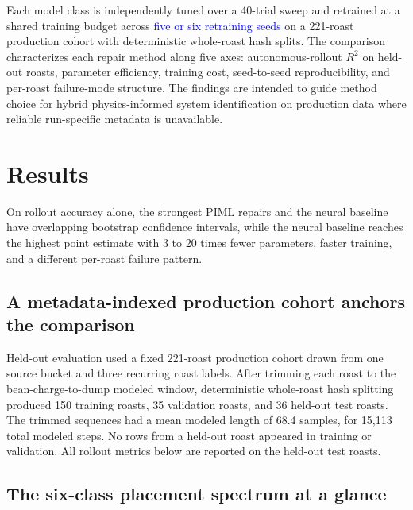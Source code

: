 \documentclass[fleqn,10pt]{wlscirep}
\newcommand{\rev}[1]{\textcolor{blue}{#1}}
\begin{document}
Each model class is independently tuned over a 40-trial sweep and retrained at a shared training budget across \rev{five or six retraining seeds} on a 221-roast production cohort with deterministic whole-roast hash splits. The comparison characterizes each repair method along five axes: autonomous-rollout $R^2$ on held-out roasts, parameter efficiency, training cost, seed-to-seed reproducibility, and per-roast failure-mode structure. The findings are intended to guide method choice for hybrid physics-informed system identification on production data where reliable run-specific metadata is unavailable.

\section*{Results}

On rollout accuracy alone, the strongest PIML repairs and the neural baseline have overlapping bootstrap confidence intervals, while the neural baseline reaches the highest point estimate with 3 to 20 times fewer parameters, faster training, and a different per-roast failure pattern.

\subsection*{A metadata-indexed production cohort anchors the comparison}

Held-out evaluation used a fixed 221-roast production cohort drawn from one source bucket and three recurring roast labels. After trimming each roast to the bean-charge-to-dump modeled window, deterministic whole-roast hash splitting produced 150 training roasts, 35 validation roasts, and 36 held-out test roasts. The trimmed sequences had a mean modeled length of 68.4 samples, for 15,113 total modeled steps. No rows from a held-out roast appeared in training or validation. All rollout metrics below are reported on the held-out test roasts.

\subsection*{The six-class placement spectrum at a glance}
\end{document}
